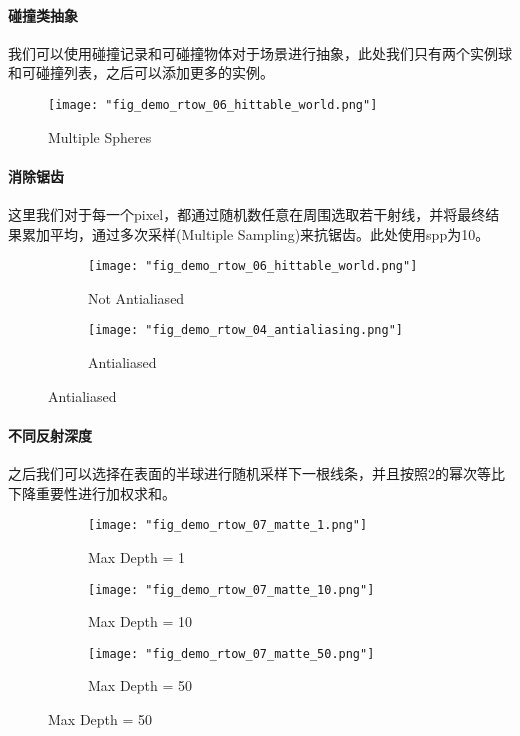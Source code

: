 \paragraph{碰撞类抽象}

我们可以使用碰撞记录和可碰撞物体对于场景进行抽象，此处我们只有两个实例球和可碰撞列表，之后可以添加更多的实例。

\begin{figure}[H]
    \texttt{[image: "fig\_demo\_rtow\_06\_hittable\_world.png"]}
    \caption{Multiple Spheres}
\end{figure}

\paragraph{消除锯齿}

这里我们对于每一个pixel，都通过随机数任意在周围选取若干射线，并将最终结果累加平均，通过多次采样(Multiple Sampling)来抗锯齿。此处使用spp为10。

\begin{figure}[H]
    \centering
        \begin{subfigure}{0.48\linewidth}
            \texttt{[image: "fig\_demo\_rtow\_06\_hittable\_world.png"]}
            \caption{Not Antialiased}
        \end{subfigure}
        \begin{subfigure}{0.48\linewidth}
            \texttt{[image: "fig\_demo\_rtow\_04\_antialiasing.png"]}
            \caption{Antialiased}
        \end{subfigure}
\end{figure}

\paragraph{不同反射深度}

之后我们可以选择在表面的半球进行随机采样下一根线条，并且按照2的幂次等比下降重要性进行加权求和。



\begin{figure}[H]
    \centering
        \begin{subfigure}{0.33\linewidth}
            \texttt{[image: "fig\_demo\_rtow\_07\_matte\_1.png"]}
            \caption{Max Depth = 1}
        \end{subfigure}
        \begin{subfigure}{0.33\linewidth}
            \texttt{[image: "fig\_demo\_rtow\_07\_matte\_10.png"]}
            \caption{Max Depth = 10}
        \end{subfigure}
        \begin{subfigure}{0.33\linewidth}
            \texttt{[image: "fig\_demo\_rtow\_07\_matte\_50.png"]}
            \caption{Max Depth = 50}
        \end{subfigure}
\end{figure}

